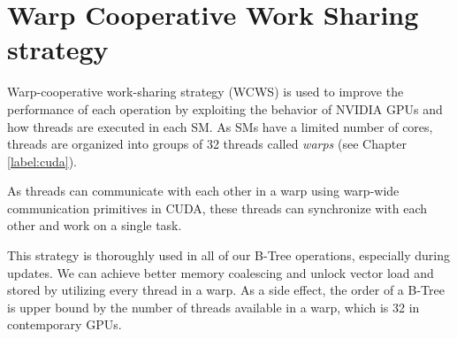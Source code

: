 \section{Warp Cooperative Work Sharing strategy}

Warp-cooperative work-sharing strategy (WCWS) is used to improve the performance of each operation by exploiting the behavior of NVIDIA GPUs and how threads are executed in each SM. As SMs have a limited number of cores, threads are organized into groups of 32 threads called \textit{warps} (see Chapter \ref{label:cuda}).

As threads can communicate with each other in a warp using warp-wide communication primitives in CUDA, these threads can synchronize with each other and work on a single task.

This strategy is thoroughly used in all of our B-Tree operations, especially during updates. We can achieve better memory coalescing and unlock vector load and stored by utilizing every thread in a warp. As a side effect, the order of a B-Tree is upper bound by the number of threads available in a warp, which is 32 in contemporary GPUs.
 
